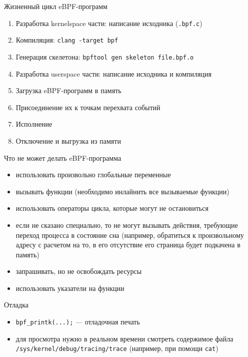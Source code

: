 \documentclass[hyperref={unicode=true}]{beamer}
\begin{document}
    \begin{frame}{Жизненный цикл eBPF-программ}
    \begin{enumerate}
    \item Разработка kernelspace части: написание исходника (\texttt{.bpf.c})
    \item Компиляция: \texttt{clang -target bpf}
    \item Генерация скелетона: \texttt{bpftool gen skeleton file.bpf.o}
    \item Разработка userspace части: написание исходника и компиляция
    \item Загрузка eBPF-программ в память
    \item Присоединение их к точкам перехвата событий
    \item Исполнение
    \item Отключение и выгрузка из памяти
    \end{enumerate}
    \end{frame}

    \begin{frame}{Что не может делать eBPF-программа}
    \begin{itemize}
    \item использовать произвольно глобальные переменные
    \item вызывать функции (необходимо инлайнить все вызываемые
            функции)
    \item использовать операторы цикла, которые могут не остановиться
    \item если не сказано специально, то не могут вызывать
    действия, требующие переход процесса в состояние сна
    (например, обратиться к произвольному адресу с расчетом на то,
     в его отсутствие его страница будет подкачена в память)
    \item запрашивать, но не освобождать ресурсы
    \item использовать указатели на функции
    \end{itemize}
    \end{frame}

    \begin{frame}{Отладка}
    \begin{itemize}
    \item \texttt{bpf\_printk(...);} --- отладочная печать
    \item для просмотра нужно в реальном времени смотреть
    содержимое файла \texttt{/sys/kernel/debug/tracing/trace}
    (например, при помощи \texttt{cat})
    \end{itemize}
    \end{frame}
\end{document}
